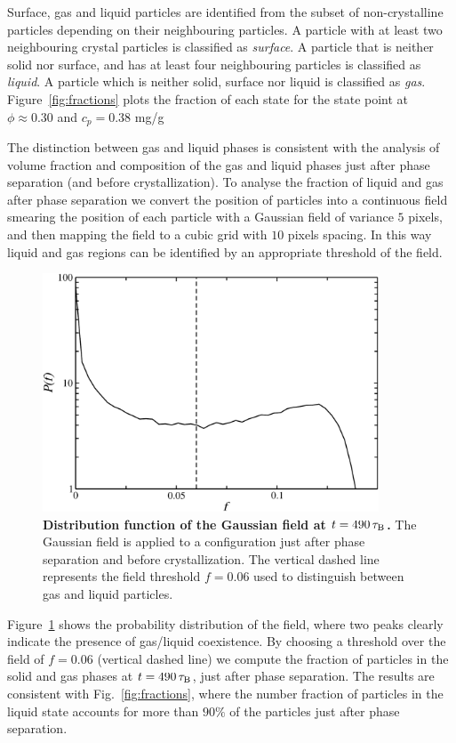 Surface, gas and liquid particles are identified from the subset of non-crystalline particles depending
on their neighbouring particles. A particle with at least two neighbouring crystal particles is classified as
\emph{surface}. A particle that is neither solid nor surface, and has at least four neighbouring particles
is classified as \emph{liquid}. A particle which is neither solid, surface nor liquid is classified as \emph{gas}.
Figure~\ref{fig:fractions} plots the fraction of each state for the state point at $\phi\approx 0.30$ and $c_p=0.38$ mg/g

The distinction between gas and liquid phases is consistent with the analysis of volume fraction and composition
of the gas and liquid phases just after phase separation (and before crystallization). To analyse the fraction
of liquid and gas after phase separation we convert the position of particles into a continuous field smearing
the position of each particle with a Gaussian field of variance $5$ pixels, and then mapping the field
to a cubic grid with $10$ pixels spacing. In this way liquid and gas regions can be identified by
an appropriate threshold of the field.

\begin{figure}[!t]
 \centering
 \includegraphics[width=10cm]{./field.pdf}
 \caption{{\bf Distribution function of the Gaussian field at $t=490\,\tau_{\rm B}$.} The Gaussian field is applied to
 a configuration just after phase separation and before crystallization. The vertical dashed line represents the
 field threshold $f=0.06$ used to distinguish between gas and liquid particles.}
 \label{fig:field}
\end{figure}

Figure~\ref{fig:field} shows the probability distribution of the field, where two peaks clearly indicate the presence
of gas/liquid coexistence. By choosing a threshold over the field of $f=0.06$ (vertical dashed line) we compute the fraction 
of particles in the solid and gas phases at $t=490\,\tau_{\rm B}$, just after phase separation. The results are consistent
with Fig.~\ref{fig:fractions}, where the number fraction of particles in the liquid state accounts for more than
$90\%$ of the particles just after phase separation.

